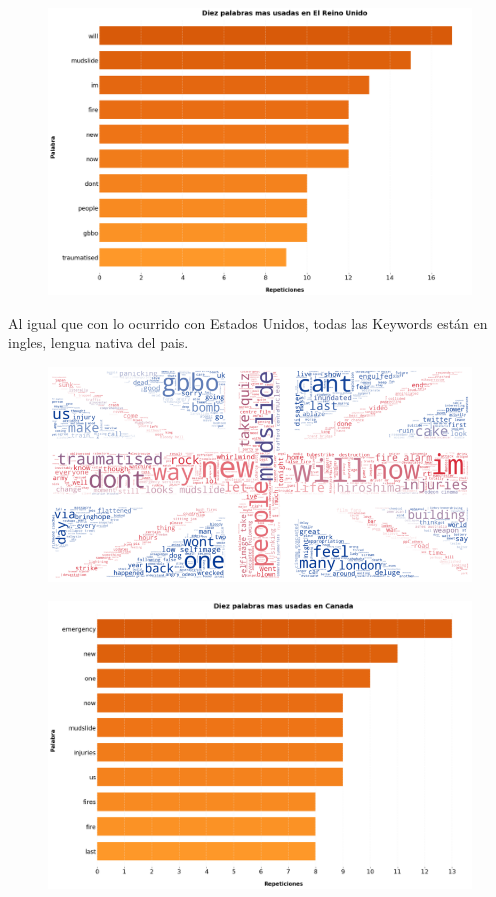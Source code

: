 \documentclass[titlepage,a4paper]{article}
\begin{document}
    \begin{figure}[H]
    \centering
    \includegraphics[width=1\textwidth]{graficos/Analisis de Locacion/10_palabras_mas_usadas_uk.png}
    \caption{}
    \end{figure}
    
    Al igual que con lo ocurrido con Estados Unidos, todas las Keywords están en ingles, lengua nativa del pais.
    
    \begin{figure}[H]
    \centering
    \includegraphics[width=1\textwidth]{graficos/Analisis de Locacion/bandera_uk.png}
    \caption{}
    \end{figure}

    \begin{figure}[H]
    \centering
    \includegraphics[width=1\textwidth]{graficos/Analisis de Locacion/10_palabras_mas_usadas_canada.png}
    \caption{}
    \end{figure}
    
\end{document}
